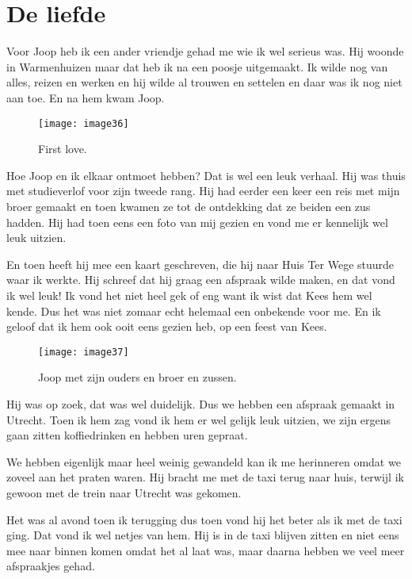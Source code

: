 \chapter*{\label{ref-009}De liefde}


 Voor Joop heb ik een ander vriendje gehad me wie ik wel serieus was. Hij woonde in Warmenhuizen maar dat heb ik na een poosje uitgemaakt. Ik wilde nog van alles, reizen en werken en hij wilde al trouwen en settelen en daar was ik nog niet aan toe. En na hem kwam Joop. 

 \begin{figure}[h]
    \begin{centering}
    \texttt{[image: image36]}
    \caption{First love.}
    \end{centering}
\end{figure}

Hoe Joop en ik elkaar ontmoet hebben? Dat is wel een leuk verhaal. Hij was thuis met studieverlof voor zijn tweede rang. Hij had eerder een keer een reis met mijn broer gemaakt en toen kwamen ze tot de ontdekking dat ze beiden een zus hadden. Hij had toen eens een foto van mij gezien en vond me er kennelijk wel leuk uitzien.

En toen heeft hij mee een kaart geschreven, die hij naar Huis Ter Wege stuurde waar ik werkte. Hij schreef dat hij graag een afspraak wilde maken, en dat vond ik wel leuk! Ik vond het niet heel gek of eng want ik wist dat Kees hem wel kende. Dus het was niet zomaar echt helemaal een onbekende voor me. En ik geloof dat ik hem ook ooit eens gezien heb, op een feest van Kees. 


\begin{figure}[h]
    \texttt{[image: image37]}
    \caption{Joop met zijn ouders en broer en zussen.}
\end{figure}

Hij was op zoek, dat was wel duidelijk. Dus we hebben een afspraak gemaakt in Utrecht. Toen ik hem zag vond ik hem er wel gelijk leuk uitzien, we zijn ergens gaan zitten koffiedrinken en hebben uren gepraat. 

We hebben eigenlijk maar heel weinig gewandeld kan ik me herinneren omdat we zoveel aan het praten waren. Hij bracht me met de taxi terug naar huis, terwijl ik gewoon met de trein naar Utrecht was gekomen. 

Het was al avond toen ik terugging dus toen vond hij het beter als ik met de taxi ging. Dat vond ik wel netjes van hem. Hij is in de taxi blijven zitten en niet eens mee naar binnen komen omdat het al laat was, maar daarna hebben we veel meer afspraakjes gehad. 

